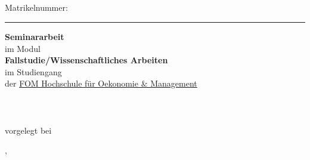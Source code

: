 \begin{titlepage}
\begin{center}
\begin{spacing}{1.8}
    {\sffamily\bfseries\LARGE\daTitelEins}\\ %
    {\sffamily\bfseries\LARGE\daTitelZwei}\\ %
    {\sffamily\bfseries\LARGE\daTitelDrei}\\ %
	{\sffamily\LARGE\daAutor}\\ %
	{\sffamily\large Matrikelnummer: \daMatrikelnummer}\\ %
  \end{spacing}%
  \hrule
  \begin{spacing}{1.1}
    {\sffamily\bfseries\Large Seminararbeit}\\ %
    {\large im Modul}\\
    {\large\bfseries Fallstudie/Wissenschaftliches Arbeiten}\\
  	{\large im Studiengang {\large \daStudiengang}} \\%
  	{\large der \href{\daUniURL}{FOM Hochschule für Oekonomie \& Management}} \\%
    {\normalsize\daAutor}\\%
    {\normalsize\daAutorAdresse}\\%
    {\normalsize\daAutorPLZ~\daAutorOrt}\\%
    {\small vorgelegt bei}\\%
    {\normalsize\daGutachterEins}\par%
  \end{spacing}
  {\normalsize \daAutorOrt, \daDate}
\end{center}

\setlength{\spalteZwei}{\textwidth}
\addtolength{\spalteZwei}{-\spalteEins}


\end{titlepage}
